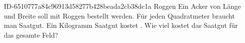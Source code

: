 \begin{exercise}
      {ID-6510777a84c96913d58277b428beada2cb38dc1a}
      {Roggen}
  \ifproblem\problem
    Ein Acker von  Länge und  Breite soll mit Roggen bestellt
    werden. Für jeden Quadratmeter braucht man  Saatgut. Ein Kilogramm
    Saatgut kostet . Wie viel kostet das Saatgut für das gesamte Feld?
  \fi
\end{exercise}

